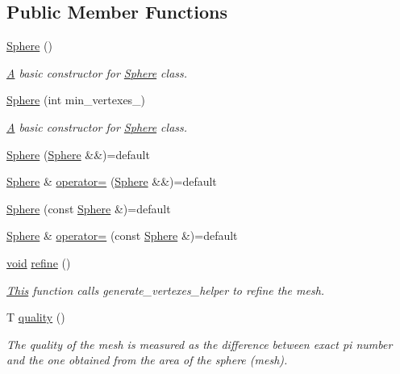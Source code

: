 \subsection*{Public Member Functions}
\begin{DoxyCompactItemize}
\item 
\mbox{\hyperlink{classSphere_acacfd6de079ea50acdaf57b823166651}{Sphere}} ()
\begin{DoxyCompactList}\small\item\em \mbox{\hyperlink{classA}{A}} basic constructor for \mbox{\hyperlink{classSphere}{Sphere}} class. \end{DoxyCompactList}\item 
\mbox{\hyperlink{classSphere_a79e3c1cb536e3fe4d8bc447e7be0e414}{Sphere}} (int min\+\_\+vertexes\+\_\+)
\begin{DoxyCompactList}\small\item\em \mbox{\hyperlink{classA}{A}} basic constructor for \mbox{\hyperlink{classSphere}{Sphere}} class. \end{DoxyCompactList}\item 
\mbox{\hyperlink{classSphere_af0d667b078ae88955113205112d9aaa6}{Sphere}} (\mbox{\hyperlink{classSphere}{Sphere}} \&\&)=default
\item 
\mbox{\hyperlink{classSphere}{Sphere}} \& \mbox{\hyperlink{classSphere_aa117f966cea7b16532cbd80c2191a84a}{operator=}} (\mbox{\hyperlink{classSphere}{Sphere}} \&\&)=default
\item 
\mbox{\hyperlink{classSphere_ae28ad7649c59d653b9e14a3042d186a1}{Sphere}} (const \mbox{\hyperlink{classSphere}{Sphere}} \&)=default
\item 
\mbox{\hyperlink{classSphere}{Sphere}} \& \mbox{\hyperlink{classSphere_ae989d05c3ea71f5a758e90e2f2e3aecf}{operator=}} (const \mbox{\hyperlink{classSphere}{Sphere}} \&)=default
\item 
\mbox{\hyperlink{glad_8h_a950fc91edb4504f62f1c577bf4727c29}{void}} \mbox{\hyperlink{classSphere_a3f5ee2b07e48a360696fe983690d1d1f}{refine}} ()
\begin{DoxyCompactList}\small\item\em \mbox{\hyperlink{classThis}{This}} function calls generate\+\_\+vertexes\+\_\+helper to refine the mesh. \end{DoxyCompactList}\item 
T \mbox{\hyperlink{classSphere_a9ebc65dabaf8d87fbe599f4b64816f73}{quality}} ()
\begin{DoxyCompactList}\small\item\em The quality of the mesh is measured as the difference between exact pi number and the one obtained from the area of the sphere (mesh). \end{DoxyCompactList}\end{DoxyCompactItemize}
